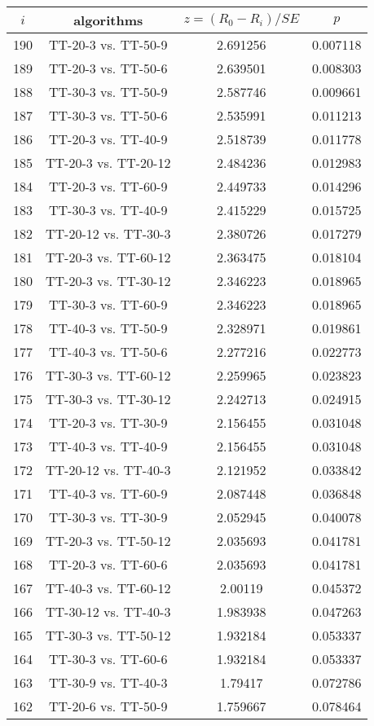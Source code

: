 \documentclass[a4paper,10pt]{article}
\begin{document}
\begin{landscape}
\begin{table}[!htp]
\centering\scriptsize
\begin{tabular}{cccc}
$i$&algorithms&$z=(R_0 - R_i)/SE$&$p$\\
\hline190&TT-20-3 vs. TT-50-9&2.691256&0.007118\\
189&TT-20-3 vs. TT-50-6&2.639501&0.008303\\
188&TT-30-3 vs. TT-50-9&2.587746&0.009661\\
187&TT-30-3 vs. TT-50-6&2.535991&0.011213\\
186&TT-20-3 vs. TT-40-9&2.518739&0.011778\\
185&TT-20-3 vs. TT-20-12&2.484236&0.012983\\
184&TT-20-3 vs. TT-60-9&2.449733&0.014296\\
183&TT-30-3 vs. TT-40-9&2.415229&0.015725\\
182&TT-20-12 vs. TT-30-3&2.380726&0.017279\\
181&TT-20-3 vs. TT-60-12&2.363475&0.018104\\
180&TT-20-3 vs. TT-30-12&2.346223&0.018965\\
179&TT-30-3 vs. TT-60-9&2.346223&0.018965\\
178&TT-40-3 vs. TT-50-9&2.328971&0.019861\\
177&TT-40-3 vs. TT-50-6&2.277216&0.022773\\
176&TT-30-3 vs. TT-60-12&2.259965&0.023823\\
175&TT-30-3 vs. TT-30-12&2.242713&0.024915\\
174&TT-20-3 vs. TT-30-9&2.156455&0.031048\\
173&TT-40-3 vs. TT-40-9&2.156455&0.031048\\
172&TT-20-12 vs. TT-40-3&2.121952&0.033842\\
171&TT-40-3 vs. TT-60-9&2.087448&0.036848\\
170&TT-30-3 vs. TT-30-9&2.052945&0.040078\\
169&TT-20-3 vs. TT-50-12&2.035693&0.041781\\
168&TT-20-3 vs. TT-60-6&2.035693&0.041781\\
167&TT-40-3 vs. TT-60-12&2.00119&0.045372\\
166&TT-30-12 vs. TT-40-3&1.983938&0.047263\\
165&TT-30-3 vs. TT-50-12&1.932184&0.053337\\
164&TT-30-3 vs. TT-60-6&1.932184&0.053337\\
163&TT-30-9 vs. TT-40-3&1.79417&0.072786\\
162&TT-20-6 vs. TT-50-9&1.759667&0.078464\\

\end{tabular}
\end{table}
\end{landscape}
\end{document}
